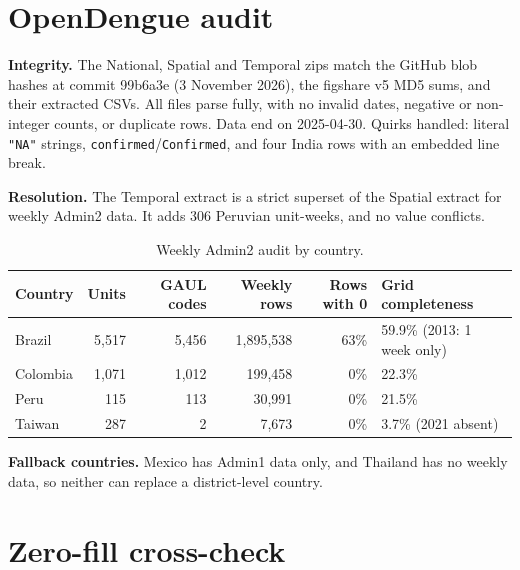 \documentclass[11pt]{article}
\begin{document}



\appendix
\clearpage

\section{OpenDengue audit}
\label{app:audit}
\textbf{Integrity.} The National, Spatial and Temporal zips match the GitHub blob hashes at commit 99b6a3e
(3 November 2026), the figshare v5 MD5 sums, and their extracted CSVs. All files parse fully,
with no invalid dates, negative or non-integer counts, or duplicate rows. Data end on 2025-04-30.
Quirks handled: literal \texttt{"NA"} strings, \texttt{confirmed}/\texttt{Confirmed}, and four India
rows with an embedded line break.

\textbf{Resolution.} The Temporal extract is a strict superset of the Spatial extract for weekly
Admin2 data. It adds 306 Peruvian unit-weeks, and no value conflicts.

\begin{table}[h]
\centering\small
\caption{Weekly Admin2 audit by country.}
\begin{tabular}{lrrrrl}
\toprule
Country & Units & GAUL codes & Weekly rows & Rows with 0 & Grid completeness \\
\midrule
Brazil & 5{,}517 & 5{,}456 & 1{,}895{,}538 & 63\% & 59.9\% (2013: 1 week only) \\
Colombia & 1{,}071 & 1{,}012 & 199{,}458 & 0\% & 22.3\% \\
Peru & 115 & 113 & 30{,}991 & 0\% & 21.5\% \\
Taiwan & 287 & 2 & 7{,}673 & 0\% & 3.7\% (2021 absent) \\
\bottomrule
\end{tabular}
\end{table}

\textbf{Fallback countries.} Mexico has Admin1 data only, and Thailand has no weekly data, so neither can
replace a district-level country.

\section{Zero-fill cross-check}
\label{app:zerofill}
\end{document}
